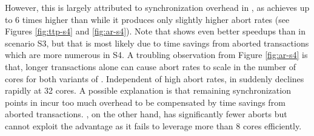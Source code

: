 However, this is largely attributed to synchronization overhead in \midas, as
\midasopt achieves up to 6 times higher \tput than \echo while it produces only
slightly higher abort rates (see Figures \ref{fig:ttp-s4} and \ref{fig:ar-s4}).
Note that \midasopt shows even better speedups than in scenario S3, but that is
most likely due to time savings from aborted transactions which are more
numerous in S4. A troubling observation from Figure \ref{fig:ar-s4} is that,
longer transactions alone can cause abort rates to scale in the number of cores
for both variants of \midas. Independent of high abort rates, \ttp in \midasopt
suddenly declines rapidly at 32 cores. A possible explanation is that remaining
synchronization points in \midasopt incur too much overhead to be compensated by
time savings from aborted transactions. \echo, on the other hand, has
significantly fewer aborts but cannot exploit the advantage as it fails to
leverage more than 8 cores efficiently.
